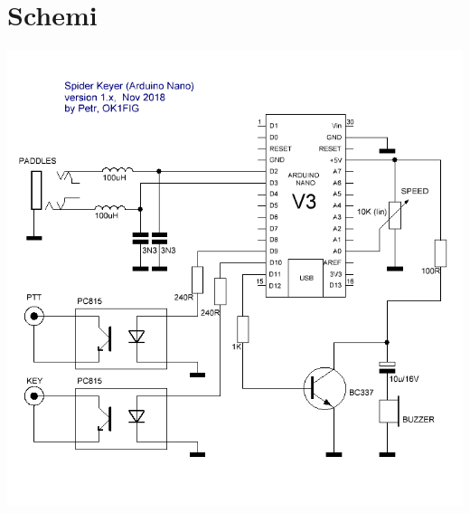 \section{Schemi}\label{sec:sch}
\begin{center}
	\includegraphics[width=\linewidth]{./schema.png}
\end{center}

